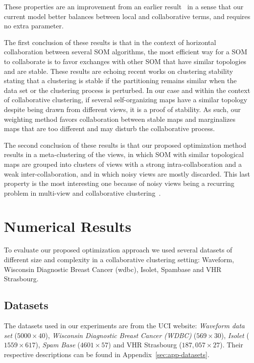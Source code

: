 These properties are an improvement from an earlier result~\cite{Sublime2017} in a sense that our current model better balances between local and collaborative terms, and requires no extra parameter.

The first conclusion of these results is that in the context of horizontal collaboration between several SOM algorithms, the most efficient way for a SOM to collaborate is to favor exchanges with other SOM that have similar topologies and are stable. These results are echoing recent works on clustering stability~\cite{stability2,vonLuxburg:2010:CSO:1774730.1774731} stating that  a clustering is stable if the partitioning remains similar when the data set or the clustering process is perturbed. 
In our case and within the context of collaborative clustering, if several self-organizing maps have a similar topology despite being drawn from different views, it is a proof of stability. As such, our weighting method favors collaboration between stable maps and marginalizes maps that are too different and may disturb the collaborative process.


The second conclusion of these results is that our proposed optimization method results in a meta-clustering of the views, in which SOM with similar topological maps are grouped into clusters of views with a strong intra-collaboration and a weak inter-collaboration, and in which noisy views are mostly discarded. This last property is the most interesting one because of noisy views being a recurring problem in multi-view and collaborative clustering~\cite{Cornuejols201881}.





\section{Numerical Results} 
\label{app:c}

To evaluate our proposed optimization approach we used several datasets of different size and complexity in a collaborative clustering setting: Waveform, Wisconsin Diagnostic Breast Cancer (wdbc), Isolet, Spambase and VHR Strasbourg.

\subsection{Datasets}
The datasets used in our experiments are from the UCI website: \textit{Waveform data set} ($5000 \times 40$), \textit{Wisconsin Diagnostic Breast Cancer (WDBC)} ($569 \times 30$), \textit{Isolet} ($1559 \times 617$), \textit{Spam Base} ($4601 \times 57$) and VHR Strasbourg ($187,057 \times 27$). Their respective descriptions can be found in Appendix~\ref{sec:app-datasets}.\\


